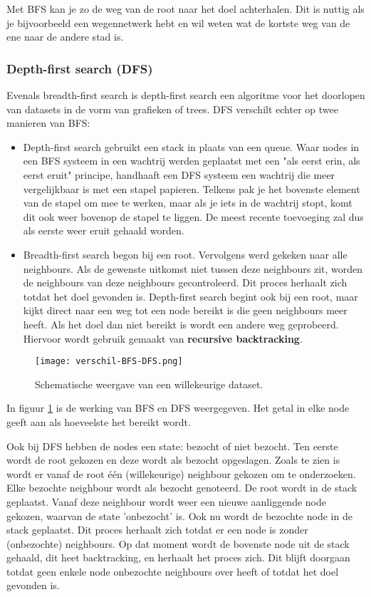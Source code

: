 Met BFS kan je zo de weg van de root naar het doel achterhalen. Dit is nuttig als je bijvoorbeeld een wegennetwerk hebt en wil weten wat de kortste weg van de ene naar de andere stad is.


\subsubsection{Depth-first search (DFS)}
Evenals breadth-first search is depth-first search een algoritme voor het doorlopen van datasets in de vorm van grafieken of trees. DFS verschilt echter op twee manieren van BFS:

\begin{itemize}
\item Depth-first search gebruikt een stack in plaats van een queue. Waar nodes in een BFS systeem in een wachtrij werden geplaatst met een "als eerst erin, als eerst eruit" principe, handhaaft een DFS systeem een wachtrij die meer vergelijkbaar is met een stapel papieren. Telkens pak je het bovenste element van de stapel om mee te werken, maar als je iets in de wachtrij stopt, komt dit ook weer bovenop de stapel te liggen. De meest recente toevoeging zal dus als eerste weer eruit gehaald worden.
\item Breadth-first search begon bij een root. Vervolgens werd gekeken naar alle neighbours. Als de gewenste uitkomst niet tussen deze neighbours zit, worden de neighbours van deze neighbours gecontroleerd. Dit proces herhaalt zich totdat het doel gevonden is.
Depth-first search begint ook bij een root, maar kijkt direct naar een weg tot een node bereikt is die geen neighbours meer heeft. Als het doel dan niet bereikt is wordt een andere weg geprobeerd. Hiervoor wordt gebruik gemaakt van \textbf{recursive backtracking}.

\end{itemize}

\begin{figure}[H]
  \centering
    \texttt{[image: verschil-BFS-DFS.png]}
  \caption{Schematische weergave van een willekeurige dataset.}
  \label{fig:verschil-BFS-DFS}
\end{figure}

In figuur \ref{fig:verschil-BFS-DFS} is de werking van BFS en DFS weergegeven. Het getal in elke node geeft aan als hoeveelste het bereikt wordt. 

Ook bij DFS hebben de nodes een state: bezocht of niet bezocht.
Ten eerste wordt de root gekozen en deze wordt als bezocht opgeslagen. Zoals te zien is wordt er vanaf de root \'e\'en (willekeurige) neighbour gekozen om te onderzoeken. Elke bezochte neighbour wordt als bezocht genoteerd. De root wordt in de stack geplaatst. Vanaf deze neighbour wordt weer een nieuwe aanliggende node gekozen, waarvan de state 'onbezocht' is. Ook nu wordt de bezochte node in de stack geplaatst. Dit proces herhaalt zich totdat er een node is zonder (onbezochte) neighbours. Op dat moment wordt de bovenste node uit de stack gehaald, dit heet backtracking, en herhaalt het proces zich. Dit blijft doorgaan totdat geen enkele node onbezochte neighbours over heeft of totdat het doel gevonden is.

